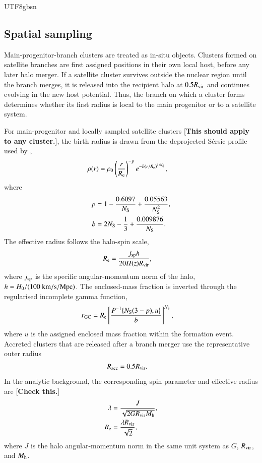 \documentclass[trackchanges, twocolappendix, twocolumn]{aastex701}
\newcommand{\czkong}[1]{{\color{magenta}[\textbf{#1}]}}
\begin{document}
\begin{CJK*}{UTF8}{gbsn}
\subsection{Spatial sampling}
\label{subsect:spatial_sampling}

Main-progenitor-branch clusters are treated as in-situ objects. Clusters formed on satellite branches are first assigned positions in their own local host, before any later halo merger. If a satellite cluster survives outside the nuclear region until the branch merges, it is released into the recipient halo at $0.5R_{\rm vir}$ and continues evolving in the new host potential. Thus, the branch on which a cluster forms determines whether its first radius is local to the main progenitor or to a satellite system.

For main-progenitor and locally sampled satellite clusters \czkong{This should apply to any cluster.}, the birth radius is drawn from the deprojected S{\'e}rsic profile used by \cite{Gao+2024GC},
\begin{align}
\rho(r) & = \rho_0 \left(\dfrac{r}{R_{\rm e}}\right)^{-p}
e^{-b\left(r / R_{\rm e}\right)^{1 / N_{\rm S}}},
\label{eq:sersic_density}
\end{align}
where
\begin{align}
p & = 1 - \dfrac{0.6097}{N_{\rm S}} + \dfrac{0.05563}{N_{\rm S}^2}, \\
b & = 2 N_{\rm S} - \dfrac{1}{3} + \dfrac{0.009876}{N_{\rm S}}.
\end{align}
The effective radius follows the halo-spin scale,
\begin{align}
R_{\rm e} & = \dfrac{j_{\rm sp}h}{20H(z)R_{\rm vir}},
\end{align}
where $j_{\rm sp}$ is the specific angular-momentum norm of the halo, $h=H_0/(100~{\rm km/s/Mpc})$. The enclosed-mass fraction is inverted through the regularised incomplete gamma function,
\begin{align}
r_{\rm GC} & = R_{\rm e}
\left[\dfrac{P^{-1}\{N_{\rm S}(3-p),u\}}{b}\right]^{N_{\rm S}},
\end{align}
where $u$ is the assigned enclosed mass fraction within the formation event. Accreted clusters that are released after a branch merger use the representative outer radius
\begin{align}
R_{\rm acc} & = 0.5R_{\rm vir}.
\end{align}
In the analytic background, the corresponding spin parameter and effective radius are \citep{Gao+2024GC} \czkong{Check this.}
\begin{align}
\lambda & = \dfrac{J}{\sqrt{2GR_{\rm vir}M_{\rm h}}},\\
R_{\rm e} & = \dfrac{\lambda R_{\rm vir}}{\sqrt{2}},
\end{align}
where $J$ is the halo angular-momentum norm in the same unit system as $G$, $R_{\rm vir}$, and $M_{\rm h}$.


\end{CJK*}
\end{document}
